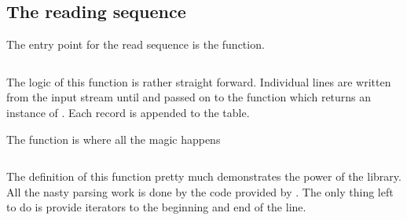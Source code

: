 \subsection{The reading sequence}

The entry point for the read sequence is the  function.
\inputminted[linenos,
             fontsize=\small,
             firstnumber=128,
             firstline=128,
             lastline=141,
             frame=lines,
             label=examples/type\_erasure\_record.cpp
             ]
{cpp}{../examples/type_erasure_record.cpp}
The logic of this function is rather straight forward. Individual lines are
written from the input stream until  and passed on to the
 function which returns an instance of . 
Each record is appended to the table. 

The  function is where all the magic happens
\inputminted[linenos,
             fontsize=\small,
             firstnumber=112,
             firstline=112,
             lastline=123,
             frame=lines,
             label=examples/type\_erasure\_record.cpp
             ]
{cpp}{../examples/type_erasure_record.cpp}
The definition of this function pretty much demonstrates the power of the
 library. All the nasty parsing work is done by the code 
provided by . The only thing left to do is provide iterators
to the beginning and end of the line.


